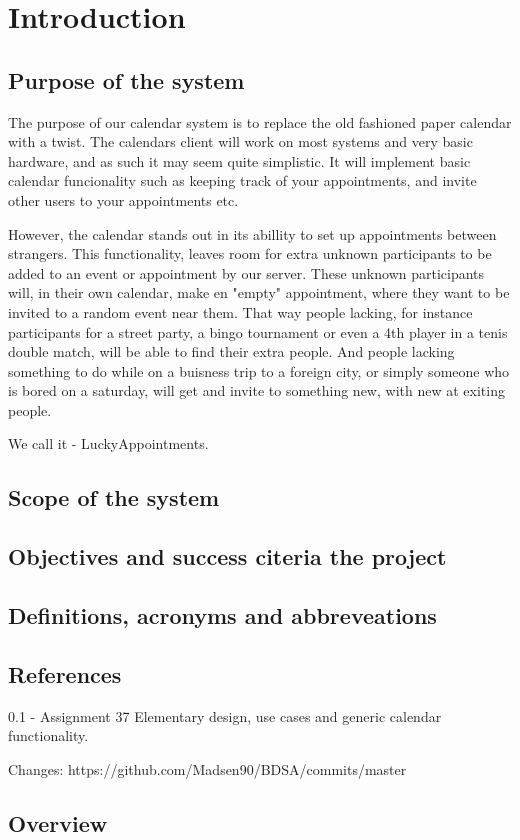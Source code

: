 \section{Introduction}
	\subsection{Purpose of the system}
		The purpose of our calendar system is to replace the old fashioned paper calendar with a twist. The calendars client will work on most systems and very basic hardware, and as such it may seem quite simplistic. It will implement basic calendar funcionality such as keeping track of your appointments, and invite other users to your appointments etc. 

		However, the calendar stands out in its abillity to set up appointments between strangers. This functionality, leaves room for extra unknown participants to be added to an event or appointment by our server. These unknown participants will, in their own calendar, make en "empty" appointment, where they want to be invited to a random event near them. That way people lacking, for instance participants for a street party, a bingo tournament or even a 4th player in a tenis double match, will be able to find their extra people. And people lacking something to do while on a buisness trip to a foreign city, or simply someone who is bored on a saturday, will get and invite to something new, with new at exiting people.

		We call it - LuckyAppointments.

	\subsection{Scope of the system}

	\subsection{Objectives and success citeria the project}
	
	\subsection{Definitions, acronyms and abbreveations}
	
	\subsection{References}
	
	0.1 - Assignment 37
	Elementary design, use cases and generic calendar functionality.

	Changes:
	https://github.com/Madsen90/BDSA/commits/master
	\subsection{Overview}